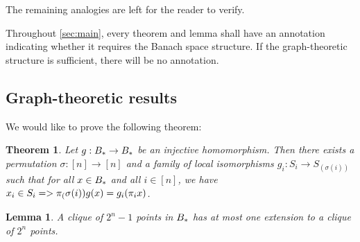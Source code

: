 \documentclass{amsart}
\newtheorem{theorem}{Theorem}
\newtheorem{lemma}{Lemma}
\theoremstyle{definition}
\begin{document}
The remaining analogies are left for the reader to verify.

Throughout \autoref{sec:main}, every theorem and lemma shall have an annotation indicating whether it requires the Banach space structure. If the graph-theoretic structure is sufficient, there will be no annotation.


\subsection{Graph-theoretic results}


We would like to prove the following theorem:

\begin{theorem} \label{thm:factors}
    Let $g : B_* \to B_*$ be an injective homomorphism. Then there exists a permutation $\sigma: [n]\to[n]$ and a family of local isomorphisms $g_i : S_i \to S_(\sigma(i))$ such that for all $x \in B_*$ and all $i \in [n]$, we have $x_i \in S_i => \pi_(\sigma(i))g(x) = g_i (\pi_i x)$.
\end{theorem}

\begin{lemma} \label{lem:clique-ext}
    A clique of $2^n-1$ points in $B_*$ has at most one extension
    to a clique of $2^n$ points.    
\end{lemma}
\end{document}
